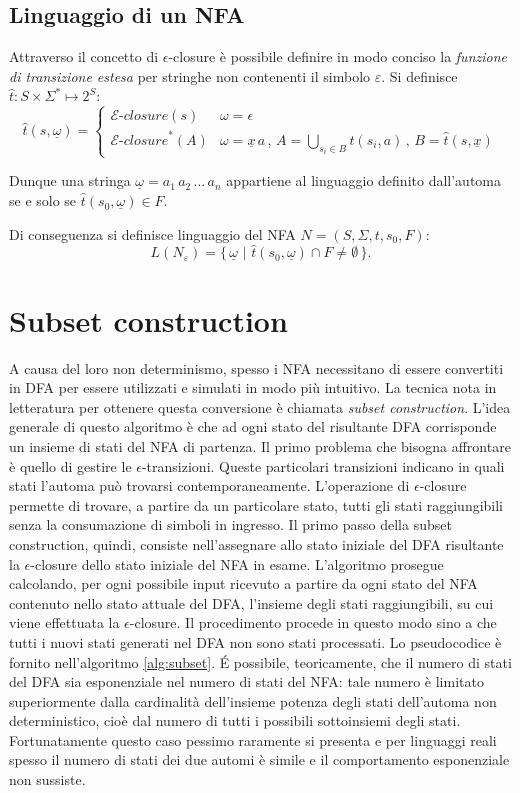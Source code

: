 \subsection{Linguaggio di un NFA}
Attraverso il concetto di $\epsilon$-closure è possibile definire in modo conciso la \emph{funzione di transizione estesa} per stringhe non contenenti il simbolo $\varepsilon$. 
Si definisce $\hat t:  S \times \Sigma^* \mapsto 2^S$:
$$
\hat t(s, \underline \omega) = \begin{cases}
\mathcal{E}\textit{-closure}(s) & \omega = \epsilon \\
\mathcal{E}\textit{-closure}^*(A) & \omega = \underline x \, a \,,\, A=\displaystyle\bigcup_{s_i \in B} t(s_i, a)\,,\,B=\hat t(s, \underline x)
\end{cases}
$$

Dunque una stringa $\underline \omega = a_1\, a_2\,\dots\,a_n$ appartiene al linguaggio definito dall'automa se e solo se $\hat t(s_0, \underline \omega) \in F$.

Di conseguenza si definisce linguaggio del NFA $N = (S,\Sigma, t, s_0, F)$:
$$
L(N_\varepsilon) = \{\,\underline \omega\,\,|\,\,\hat t(s_0, \underline \omega) \cap F \ne \emptyset\,\}.
$$


\newpage
\section{Subset construction}
A causa del loro non determinismo, spesso i NFA necessitano di essere convertiti in DFA per essere utilizzati e simulati in modo più intuitivo. La tecnica nota in letteratura per ottenere questa conversione è chiamata \emph{subset construction}.
L'idea generale di questo algoritmo è che ad ogni stato del risultante DFA corrisponde un insieme di stati del NFA di partenza.
Il primo problema che bisogna affrontare è quello di gestire le $\epsilon$-transizioni. Queste particolari transizioni indicano in quali stati l'automa può trovarsi contemporaneamente. L'operazione di $\epsilon$-closure permette di trovare, a partire da un particolare stato, tutti gli stati raggiungibili senza la consumazione di simboli in ingresso. Il primo passo della subset construction, quindi, consiste nell'assegnare allo stato iniziale del DFA risultante la $\epsilon$-closure dello stato iniziale del NFA in esame. L'algoritmo prosegue calcolando, per ogni possibile input ricevuto a partire da ogni stato del NFA contenuto nello  stato attuale del DFA, l'insieme degli stati raggiungibili, su cui viene effettuata la $\epsilon$-closure. Il procedimento procede in questo modo sino a che tutti i nuovi stati generati nel DFA non sono stati processati. Lo pseudocodice è fornito nell'algoritmo \ref{alg:subset}.
\'E possibile, teoricamente, che il numero di stati del DFA sia esponenziale nel numero di stati del NFA: tale numero è limitato superiormente dalla cardinalità dell'insieme potenza degli stati dell'automa non deterministico, cioè dal numero di tutti i possibili sottoinsiemi degli stati.
Fortunatamente questo caso pessimo raramente si presenta e per linguaggi reali spesso il numero di stati dei due automi è simile e il comportamento esponenziale non sussiste.

